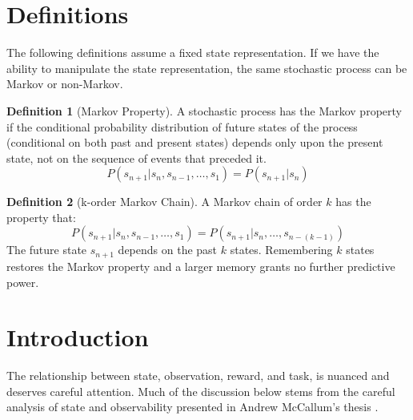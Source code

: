 \documentclass{article} %
\title{}
\author{}
\theoremstyle{definition}
\newtheorem{definition}{Definition}[section]
\begin{document}
\maketitle

\begin{abstract}
We seek to contribute:\\
1) A clear understanding of partial observability.\\
2) A measure of the degree to which a domain is partially observable.\\
3) A way to quantify the deficiency of a given state representation.\\
\end{abstract}

\section{Definitions}
The following definitions assume a fixed state representation. If we
have the ability to manipulate the state representation, the same
stochastic process can be Markov or non-Markov.

\begin{definition}[Markov Property]
\label{def:markov}
A stochastic process has the Markov property if the conditional
probability distribution of future states of the process (conditional
on both past and present states) depends only upon the present state,
not on the sequence of events that preceded it.
\[
P(s_{n+1} | s_{n}, s_{n-1}, \dots, s_{1}) = P(s_{n+1} | s_{n})
\]
\end{definition}

\begin{definition}[k-order Markov Chain]
A Markov chain of order $k$ has the property that:
\[
P(s_{n+1} | s_{n}, s_{n-1}, \dots, s_{1}) = P(s_{n+1} | s_{n}, \dots, s_{n-(k-1)})
\]
The future state $s_{n+1}$ depends on the past $k$ states. Remembering
$k$ states restores the Markov property and a larger memory grants no
further predictive power.
\end{definition}

\section{Introduction}
The relationship between state, observation, reward, and task, is
nuanced and deserves careful attention. Much of the discussion below
stems from the careful analysis of state and observability presented
in Andrew McCallum's thesis \cite{McCallum96}.
\end{document}
